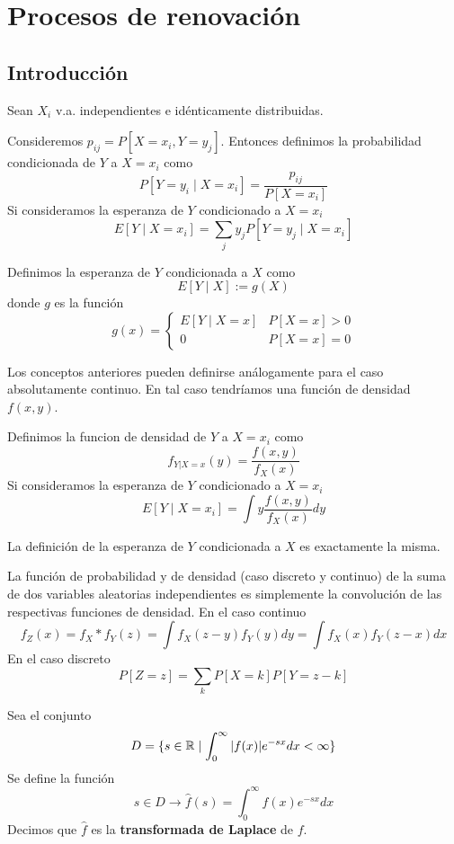 \documentclass[PREyA.tex]{subfiles}
\begin{document}
\chapter{Procesos de renovación}
\section{Introducción}
\begin{defi}Sean $X_i$ v.a. independientes e idénticamente distribuidas.
\end{defi}
\begin{defi}
Consideremos $p_{ij}=P[X=x_i,Y=y_j]$. Entonces definimos la probabilidad condicionada de $Y$ a $X=x_i$ como
$$
P[Y=y_i \mid X=x_i] = \frac{p_{ij}}{P[X=x_i]}
$$
Si consideramos la esperanza de $Y$ condicionado a $X=x_i$ 
$$
E[Y\mid X=x_i] = \sum_j y_j P[Y=y_j \mid X=x_i]
$$
\end{defi}
\begin{defi}
Definimos la esperanza de $Y$ condicionada a $X$ como
$$
E[Y\mid X]:= g(X)
$$
donde $g$ es la función
$$
g(x)=\begin{cases}
E[Y\mid X=x] & P[X=x]>0\\
0 & P[X=x]=0
\end{cases}
$$
\end{defi}
Los conceptos anteriores pueden definirse análogamente para el caso absolutamente continuo. En tal caso tendríamos una función de densidad $f(x,y)$.
\begin{defi}
Definimos la funcion de densidad de $Y$ a $X=x_i$ como
$$
f_{Y|X=x}(y)=\frac{f(x,y)}{f_X(x)}
$$
Si consideramos la esperanza de $Y$ condicionado a $X=x_i$ 
$$
E[Y\mid X=x_i] = \int y \frac{f(x,y)}{f_X(x)} dy
$$
\end{defi}
La definición de la esperanza de $Y$ condicionada a $X$ es exactamente la misma.
\begin{prop}
La función de probabilidad y de densidad (caso discreto y continuo) de la suma de dos variables aleatorias independientes es simplemente la convolución de las respectivas funciones de densidad. En el caso continuo
$$
f_Z(x)=f_X * f_Y (z) = \int f_X(z-y)f_Y(y)dy = \int f_X(x)f_Y(z-x)dx
$$
En el caso discreto
$$
P[Z=z] = \sum_k P[X=k]P[Y=z-k]
$$
\end{prop}
\begin{defi}
Sea el conjunto
$$
D=\{s \in \mathbb{R} \mid \int_0^\infty |f(x)|e^{-sx}dx < \infty\}
$$
Se define la función
$$
s \in D \to \hat{f}(s)= \int_0^\infty f(x)e^{-sx}dx
$$
Decimos que $\hat{f}$ es la \textbf{transformada de Laplace} de $f$.
\end{defi}
\end{document}
